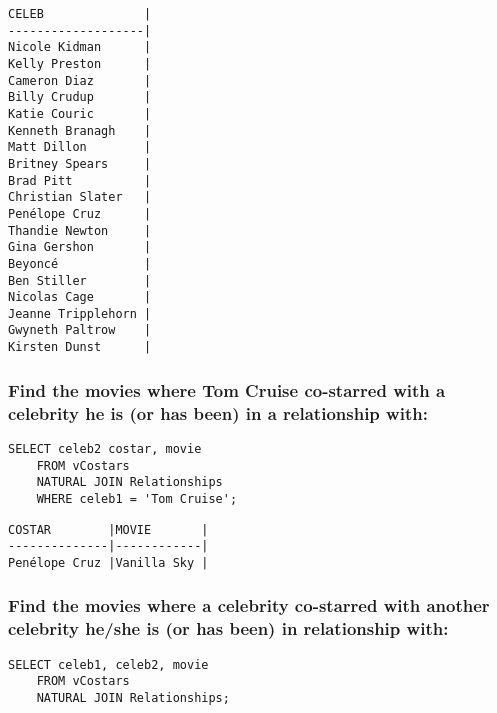 \documentclass{article}
\begin{document}
        \begin{verbatim}
CELEB              |
-------------------|
Nicole Kidman      |
Kelly Preston      |
Cameron Diaz       |
Billy Crudup       |
Katie Couric       |
Kenneth Branagh    |
Matt Dillon        |
Britney Spears     |
Brad Pitt          |
Christian Slater   |
Penélope Cruz      |
Thandie Newton     |
Gina Gershon       |
Beyoncé            |
Ben Stiller        |
Nicolas Cage       |
Jeanne Tripplehorn |
Gwyneth Paltrow    |
Kirsten Dunst      |
        \end{verbatim}
        
    \subsubsection*{Find the movies where Tom Cruise co-starred with a celebrity he is (or has been) in
a relationship with:}
        \begin{verbatim}
SELECT celeb2 costar, movie
    FROM vCostars
    NATURAL JOIN Relationships
    WHERE celeb1 = 'Tom Cruise';\end{verbatim}
    
        \begin{verbatim}
COSTAR        |MOVIE       |
--------------|------------|
Penélope Cruz |Vanilla Sky |
        \end{verbatim}
        
        
    
    \subsubsection*{ Find the movies where a celebrity co-starred with another celebrity he/she is (or has
been) in relationship with:}
        \begin{verbatim}
SELECT celeb1, celeb2, movie
    FROM vCostars
    NATURAL JOIN Relationships;\end{verbatim}
    
\end{document}
